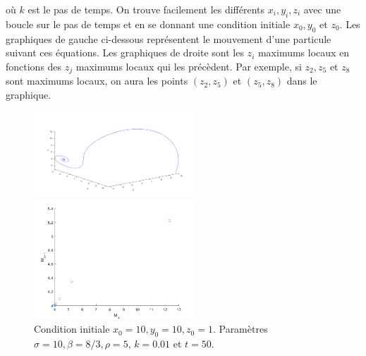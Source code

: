 \documentclass[a4paper, 12pt]{report}
\begin{document}
où $k$ est le pas de temps. On trouve facilement les différents $x_i, y_i, z_i$
avec une boucle sur le pas de temps et en se donnant une condition initiale
$x_0, y_0$ et $z_0$. Les graphiques de gauche ci-dessous représentent
le mouvement d'une particule suivant ces équations. Les graphiques de droite
sont les $z_i$ maximums locaux en fonctions des $z_j$ maximums locaux qui les
précèdent. Par exemple, si $z_2, z_5$ et $z_8$ sont maximums locaux, on aura
les points $(z_2, z_5)$ et $(z_5, z_8)$ dans le graphique.

\begin{figure}[H]
    \centering
    \begin{minipage}[t]{6cm}
        \centering
        \includegraphics[width=6cm]{images/lorenz5.png}
    \end{minipage}\hspace{1cm}
    \begin{minipage}[t]{6cm}
        \centering
        \includegraphics[width=6cm]{images/lorenz_m_5.png}
    \end{minipage}
    \caption{Condition initiale $x_0 = 10, y_0 = 10, z_0=1$. Paramètres $\sigma=10, \beta=8/3, \rho=5$, $k=0.01$ et $t=50$.}
\end{figure}
\end{document}
